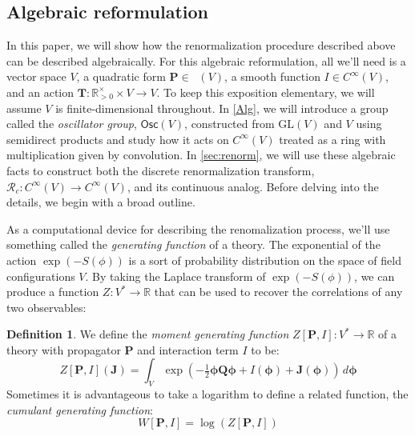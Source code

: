 \documentclass[12pt]{article}
\newcounter{counter}
\theoremstyle{definition}
\newtheorem{dfn}[counter]{Definition}
\theoremstyle{plain}
\newcommand{\Symp}{\mathop{\mathrm{Sym}_2^+}}
\begin{document}
\subsection{Algebraic reformulation}

In this paper, we will show how the renormalization procedure described above can be described algebraically. 
For this algebraic reformulation, all we'll need is a vector space $V$, a quadratic form $\mathbf{P}\in\Symp (V)$, a smooth function $I\in C^\infty(V)$, and an action $\mathbf{T} : \mathbb{R}^\times_{>0} \times V\to V$.
To keep this exposition elementary, we will assume $V$ is finite-dimensional throughout.
In \autoref{Alg}, we will introduce a group called the \emph{oscillator group}, $\mathsf{Osc}(V)$, constructed from $\mathrm{GL}(V)$ and $V$ using semidirect products and study how it acts on $C^\infty(V)$ treated as a ring with multiplication given by convolution. In \autoref{sec:renorm}, we will use these algebraic facts to construct both the discrete renormalization transform, $\mathcal{R}_c: C^\infty(V)\to C^\infty(V)$, and its continuous analog. 
Before delving into the details, we begin with a broad outline.

As a computational device for describing the renomalization process, we'll use something called the \emph{generating function} of a theory. The exponential of the action $\exp(-S(\phi))$ is a sort of probability distribution on the space of field configurations $V$. By taking the Laplace transform of $\exp(-S(\phi))$, we can produce a function $Z:V^*\to\mathbb{R}$ that can be used to recover the correlations of any two observables:\\

\begin{dfn} \label{def:generatingFunction}
We define the \emph{moment generating function} $Z[\mathbf{P},I]:V^*\to\mathbb{R}$ of a theory with propagator $\mathbf{P}$ and interaction term $I$ to be:
\begin{equation}
    Z[\mathbf{P},I](\mathbf{J}) = \int_{V}
  \exp (-\tfrac{1}{2} \boldsymbol\phi \mathbf{Q} \boldsymbol\phi +
  I (\boldsymbol\phi) + \mathbf{J}(\boldsymbol\phi))
  \, d\boldsymbol\phi
\end{equation}
Sometimes it is advantageous to take a logarithm to define a related function, the \emph{cumulant generating function}:
\begin{equation}
    W[\mathbf{P},I] = \log(Z[\mathbf{P},I])
\end{equation}
\end{dfn}
\end{document}
